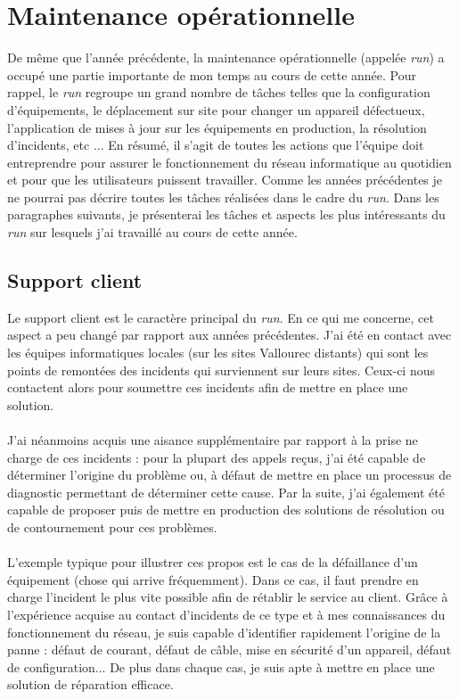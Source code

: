 \documentclass[a4paper,12pt]{report}
\begin{document}
\section{Maintenance opérationnelle}
De même que l'année précédente, la maintenance opérationnelle (appelée \textit{run}) a occupé une partie importante de mon temps au cours de cette année. Pour rappel, le \textit{run} regroupe un grand nombre de tâches telles que la configuration d'équipements, le déplacement sur site pour changer un appareil défectueux, l'application de mises à jour sur les équipements en production, la résolution d'incidents, etc ... En résumé, il s'agit de toutes les actions que l'équipe doit entreprendre pour assurer le fonctionnement du réseau informatique au quotidien et pour que les utilisateurs puissent travailler. Comme les années précédentes je ne pourrai pas décrire toutes les tâches réalisées dans le cadre du \textit{run}. Dans les paragraphes suivants, je présenterai les tâches et aspects les plus intéressants du \textit{run} sur lesquels j'ai travaillé au cours de cette année.

\subsection{Support client}
Le support client est le caractère principal du \textit{run}. En ce qui me concerne, cet aspect a peu changé par rapport aux années précédentes. J'ai été en contact avec les équipes informatiques locales (sur les sites Vallourec distants) qui sont les points de remontées des incidents qui surviennent sur leurs sites. Ceux-ci nous contactent alors pour soumettre ces incidents afin de mettre en place une solution.
\paragraph{}
J'ai néanmoins acquis une aisance supplémentaire par rapport à la prise ne charge de ces incidents : pour la plupart des appels reçus, j'ai été capable de déterminer l'origine du problème ou, à défaut de mettre en place un processus de diagnostic permettant de déterminer cette cause. Par la suite, j'ai également été capable de proposer puis de mettre en production des solutions de résolution ou de contournement pour ces problèmes.
\paragraph{}
L'exemple typique pour illustrer ces propos est le cas de la défaillance d'un équipement (chose qui arrive fréquemment). Dans ce cas, il faut prendre en charge l'incident le plus vite possible afin de rétablir le service au client. Grâce à l'expérience acquise au contact d'incidents de ce type et à mes connaissances du fonctionnement du réseau, je suis capable d'identifier rapidement l'origine de la panne : défaut de courant, défaut de câble, mise en sécurité d'un appareil, défaut de configuration... De plus dans chaque cas, je suis apte à mettre en place une solution de réparation efficace.
\end{document}
